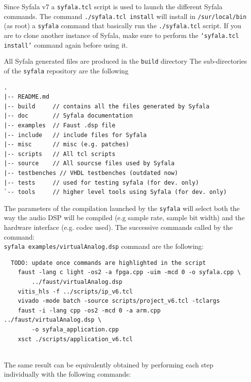 \documentclass[11pt]{article}
\numberwithin{equation}{section}
\numberwithin{figure}{section}
\begin{document}
Since Syfala v7 a {\tt syfala.tcl} script is used to launch the different Syfala commands. The command \texttt{./syfala.tcl install} will install in {\tt /sur/local/bin}  (as root) a {\tt syfala} command that basically run the {\tt ./syfala.tcl} script. If you are to clone another instance of Syfala, make sure to perform the {\tt `syfala.tcl install'} command again before using it.

All Syfala generated files are produced in the {\tt build} directory 
The sub-directories of the {\tt syfala} repository are the following
\begin{verbatim}
.
|-- README.md
|-- build     // contains all the files generated by Syfala
|-- doc       // Syfala documentation 
|-- examples  // Faust .dsp file
|-- include   // include files for Syfala
|-- misc      // misc (e.g. patches)
|-- scripts   // All tcl scripts
|-- source    // All sourcse files used by Syfala
|-- testbenches // VHDL testbenches (outdated now) 
|-- tests     // used for testing syfala (for dev. only) 
`-- tools     // higher level tools using Syfala (for dev. only)
\end{verbatim}

The parameters of the compilation launched by the {\tt syfala} will select both the way the audio DSP will be compiled (e.g sample rate, sample bit width) and the hardware interface (e.g. codec used). The successive commands called by the command: \\
{\tt syfala examples/virtualAnalog.dsp} command  are the following:\\

  \begin{boxedminipage}{\textwidth}
\begin{verbatim}
  TODO: update once commands are highlighted in the script
    faust -lang c light -os2 -a fpga.cpp -uim -mcd 0 -o syfala.cpp \
        ../faust/virtualAnalog.dsp
    vitis_hls -f ../scripts/ip_v6.tcl
    vivado -mode batch -source scripts/project_v6.tcl -tclargs 
    faust -i -lang cpp -os2 -mcd 0 -a arm.cpp ../faust/virtualAnalog.dsp \
        -o syfala_application.cpp
    xsct ./scripts/application_v6.tcl
\end{verbatim}
\end{boxedminipage}

  ~\\
  The same result can be equivalently obtained by performing each step individually with the following commands:\\
\end{document}
